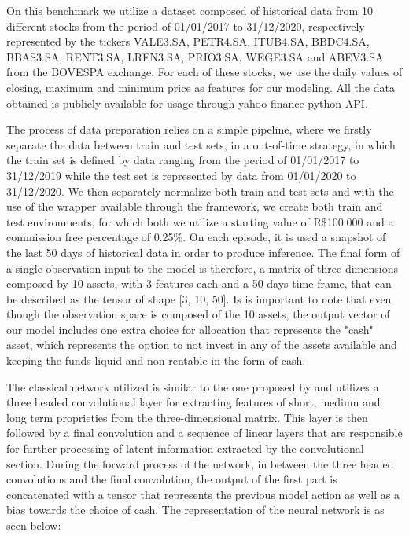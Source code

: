 On this benchmark we utilize a dataset composed of historical data from 10 different stocks from the period of 01/01/2017 to 31/12/2020, respectively represented by the tickers VALE3.SA, PETR4.SA, ITUB4.SA, BBDC4.SA, BBAS3.SA, RENT3.SA, LREN3.SA, PRIO3.SA, WEGE3.SA and ABEV3.SA from the BOVESPA exchange. For each of these stocks, we use the daily values of closing, maximum and minimum price as features for our modeling. All the data obtained is publicly available for usage through yahoo finance python API.

The process of data preparation relies on a simple pipeline, where we firstly separate the data between train and test sets, in a out-of-time strategy, in which the train set is defined by data ranging from the period of 01/01/2017 to 31/12/2019 while the test set is represented by data from 01/01/2020 to 31/12/2020. We then separately normalize both train and test sets and with the use of the wrapper available through the framework, we create both train and test environments, for which both we utilize a starting value of R\$100.000 and a commission free percentage of 0.25\%. On each episode, it is used a snapshot of the last 50 days of historical data in order to produce inference. The final form of a single observation input to the model is therefore, a matrix of three dimensions composed by 10 assets, with 3 features each and a 50 days time frame, that can be described as the tensor of shape [3, 10, 50]. Is is important to note that even though the observation space is composed of the 10 assets, the output vector of our model includes one extra choice for allocation that represents the "cash" asset, which represents the option to not invest in any of the assets available and keeping the funds liquid and non rentable in the form of cash.

The classical network utilized is similar to the one proposed by \cite{jiang2017deepreinforcementlearningframework} and utilizes a three headed convolutional layer for extracting features of short, medium and long term proprieties from the three-dimensional matrix. This layer is then followed by a final convolution and a sequence of linear layers that are responsible for further processing of latent information extracted by the convolutional section. During the forward process of the network, in between the three headed convolutions and the final convolution, the output of the first part is concatenated with a tensor that represents the previous model action as well as a bias towards the choice of cash. The representation of the neural network is as seen below:

